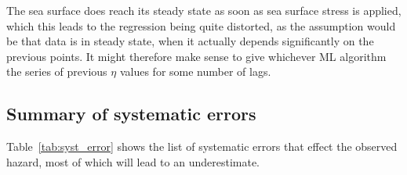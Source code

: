The sea surface does reach its steady state as soon as sea surface
stress is applied, which this leads
to the regression being quite distorted, as the assumption would be that data
is in steady state, when it actually depends significantly on the previous points.
It might therefore make sense to give whichever ML algorithm
the series of previous $\eta$ values for some number of lags.


\subsection{Summary of systematic errors}
\label{sec:sys-errors}
Table~\ref{tab:syst_error} shows the list of systematic errors that effect the
observed hazard, most of which will lead to an underestimate.


